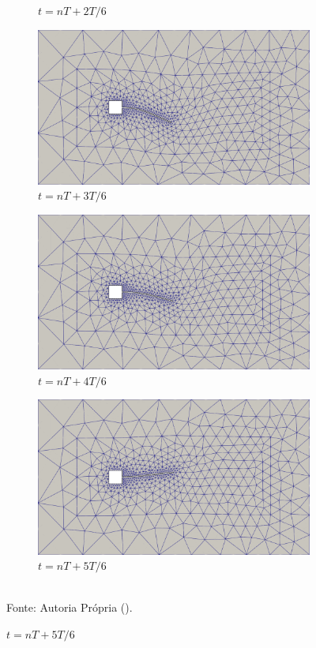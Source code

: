 \begin{figure}[h!]
\begin{subfigure}[b]{0.49\textwidth}
        \caption{$t=nT+2T/6$}
    \end{subfigure}
    \begin{subfigure}[b]{0.49\textwidth}
        \includegraphics[width=\linewidth]{Figuras/FSI-prism2/mT4.png}
        \caption{$t=nT+3T/6$}
    \end{subfigure}
    \begin{subfigure}[b]{0.49\textwidth}
        \includegraphics[width=\linewidth]{Figuras/FSI-prism2/mT5.png}
        \caption{$t=nT+4T/6$}
    \end{subfigure}
    \begin{subfigure}[b]{0.49\textwidth}
        \includegraphics[width=\linewidth]{Figuras/FSI-prism2/mT6.png}
        \caption{$t=nT+5T/6$}
    \end{subfigure}
    \\Fonte: Autoria Própria (\the\year).
    \label{fig:prismMesh2}
\end{figure}

